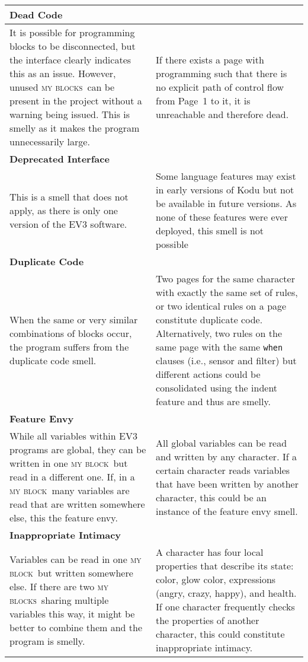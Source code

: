 \documentclass[conference]{IEEEtran}
\newcommand{\mbs}{\textsc{my blocks}}
\newcommand{\mb}{\textsc{my block}}
\begin{document}
\begin{table*}
\begin{tabular}{| p{3.38in} | p{3.37in} |}
\multicolumn{2}{l}{\textbf{Dead Code}} \\ \hline
 It is possible for programming blocks to be disconnected, but the interface clearly indicates this as an issue. However, unused \mbs~can be present in the project without a warning being issued. This is smelly as it makes the program unnecessarily large.  & If there exists a page with programming such that there is no explicit path of control flow from Page~1 to it, it is unreachable and therefore dead. \\ \hline
 \textbf{Deprecated Interface}\\ \hline
This is a smell that does not apply, as there is only one version of the EV3 software. &Some language features may exist in early versions of Kodu but not be available in future versions. As none of these features were ever deployed, this smell is not possible\\ \hline
\textbf{Duplicate Code} \\ \hline
When the same or very similar combinations of blocks occur, the program suffers from the duplicate code smell.
&Two pages for the same character with exactly the same set of rules, or two identical rules on a page constitute duplicate code. 
Alternatively, two rules on the same page with the same {\tt when} clauses (i.e., sensor and filter) but different actions could be consolidated using the indent feature and thus are smelly. \\ \hline
\textbf{Feature Envy} \\ \hline
While all variables within EV3 programs are global, they can be written in one \mb~but read in a different one. If, in a \mb~many variables are read that are written somewhere else, this the feature envy. 
& All global variables can be read and written by any character. If a certain character reads variables that have been written by another character, this could be an instance of the feature envy smell.\\ \hline
\textbf{Inappropriate Intimacy} \\ \hline
Variables can be read in one \mb~but written somewhere else. If there are two \mbs~sharing multiple variables this way, it might be better to combine them and the program is smelly. 
& A character has four local properties that describe its state: color, glow color, expressions (angry, crazy, happy), and health.  If one character frequently checks the properties of another character, this could constitute inappropriate intimacy.\\ \hline

\end{tabular}
\end{table*}
\end{document}
